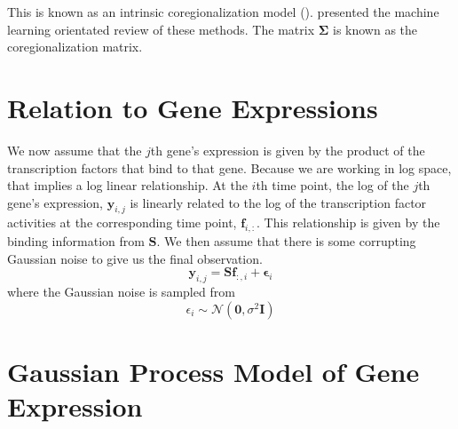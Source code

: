 This is known as an intrinsic coregionalization model (\cite{Wackernagel:2003}). 
\cite{Alvarez:2012} presented the machine learning orientated review of these methods. 
The matrix $\boldsymbol{\Sigma}$ is known as the coregionalization matrix.

\section{Relation to Gene Expressions}

We now assume that the $j$th gene's expression is given by the product of the transcription factors that bind to 
that gene. Because we are working in log space, that implies a log linear relationship. At the $i$th time point, 
the log of the $j$th gene's expression, $\mathbf{y}_{i,j}$ is linearly related to the log of the transcription 
factor activities at the corresponding time point, $\mathbf{f}_{i, :}$. This relationship is given by the binding 
information from $\mathbf{S}$. We then assume that there is some corrupting Gaussian noise to give us the final 
observation.
\begin{equation} \label{eq:yij}
  \mathbf{y}_{i, j} = \mathbf{S}\mathbf{f}_{:, i} + \boldsymbol{\epsilon}_i
\end{equation}  
where the Gaussian noise is sampled from
\begin{equation} \label{eq:epsi}
  \epsilon_i \sim \mathcal{N}(\mathbf{0}, \sigma^2 \mathbf{I})
\end{equation}

\section{Gaussian Process Model of Gene Expression}


